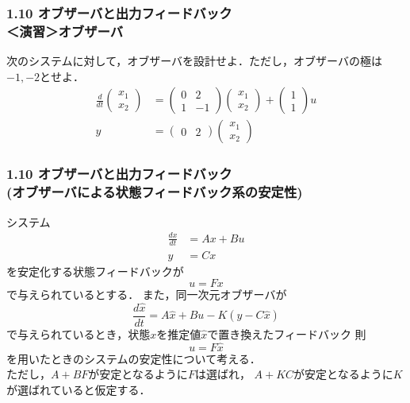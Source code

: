 \documentclass[10pt]{beamer}
\begin{document}
\begin{frame}[t]
\frametitle{1.10 オブザーバと出力フィードバック\\ ＜演習＞オブザーバ}
次のシステムに対して，オブザーバを設計せよ．ただし，オブザーバの極は$-1,-2$とせよ．
\begin{align*}
	\frac{d}{dt}
	\left (
	\begin{array}{c}
	 x_1 \\ x_2 
	\end{array}
	\right )
	& = 
	\left (
	\begin{array}{cc}
	 0 & 2 \\
	 1 & -1
	\end{array}
	\right )
	\left (
	\begin{array}{c}
	 x_1 \\ x_2 
	\end{array}
	\right )
	+
	\left (
	\begin{array}{c}
	 1 \\ 1 
	\end{array}
	\right )
	u
\\
	y&=
	\left ( \begin{array}{cc}
		0 & 2 
	\end{array} \right )
	\left (	\begin{array}{c}
		x_1 \\ x_2 
	\end{array} \right )
\end{align*}
\end{frame}


\begin{frame}[t]
\frametitle{1.10 オブザーバと出力フィードバック \\
(オブザーバによる状態フィードバック系の安定性)}
システム
\begin{align}
 \frac{dx}{dt} &= A x + B u \\
 y             &= C x
\end{align}
を安定化する状態フィードバックが
\begin{equation}
 u = F x
\end{equation}
で与えられているとする．
また，同一次元オブザーバが
\begin{equation}
 \frac{d \hat{x}}{dt} = A \hat{x} + B u - K (y - C \hat{x})
  
\end{equation}
で与えられているとき，状態$x$を推定値$\hat{x}$で置き換えたフィードバック
則
\begin{equation}
 u = F \hat{x}
\end{equation}
を用いたときのシステムの安定性について考える．\\
ただし，$A + BF$が安定となるように$F$は選ばれ，
$A + KC$が安定となるように$K$が選ばれていると仮定する．
\end{frame}
\end{document}

